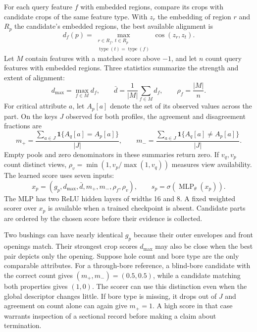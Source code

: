 For each query feature $f$ with embedded regions, compare its crops with candidate crops of the same feature type. With $z_r$ the embedding of region $r$ and $R_p$ the candidate's embedded regions, the best available alignment is
\begin{equation}
 d_f(p)=\max_{\substack{r\in R_f,\ t\in R_p\\
                   \operatorname{type}(t)=\operatorname{type}(f)}}
                   \cos(z_r,z_t).
\end{equation}
Let $M$ contain features with a matched score above $-1$, and let $n$ count query features with embedded regions. Three statistics summarize the strength and extent of alignment:
\begin{equation}
 d_{\max}=\max_{f\in M}d_f,\qquad
 \bar d=\frac{1}{|M|}\sum_{f\in M}d_f,\qquad
 \rho_f=\frac{|M|}{n}.
\end{equation}
For critical attribute $a$, let $A_p[a]$ denote the set of its observed values across the part. On the keys $J$ observed for both profiles, the agreement and disagreement fractions are
\begin{equation}
 m_+=\frac{\sum_{a\in J}\mathbf1\{A_q[a]=A_p[a]\}}{|J|},\qquad
 m_-=\frac{\sum_{a\in J}\mathbf1\{A_q[a]\ne A_p[a]\}}{|J|}.
\end{equation}
Empty pools and zero denominators in these summaries return zero. If $v_q,v_p$ count distinct views, $\rho_v=\min(1,v_p/\max(1,v_q))$ measures view availability. The learned score uses seven inputs:
\begin{equation}
 x_p=(g_p,d_{\max},\bar d,m_+,m_-,\rho_f,\rho_v),\qquad
 s_p=\sigma\!\left(\operatorname{MLP}_{\theta}(x_p)\right).
\end{equation}
The MLP has two ReLU hidden layers of widths 16 and 8. A fixed weighted scorer over $x_p$ is available when a trained checkpoint is absent. Candidate parts are ordered by the chosen score before their evidence is collected.

Two bushings can have nearly identical $g_p$ because their outer envelopes and front openings match. Their strongest crop scores $d_{\max}$ may also be close when the best pair depicts only the opening. Suppose hole count and bore type are the only comparable attributes. For a through-bore reference, a blind-bore candidate with the correct count gives $(m_+,m_-)=(0.5,0.5)$, while a candidate matching both properties gives $(1,0)$. The scorer can use this distinction even when the global descriptor changes little. If bore type is missing, it drops out of $J$ and agreement on count alone can again give $m_+=1$. A high score in that case warrants inspection of a sectional record before making a claim about termination.

